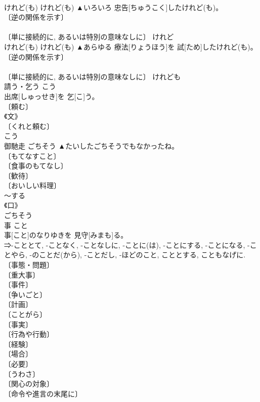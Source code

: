 \documentclass[8pt]{extreport}
\begin{document}
\begin{CJK}{UTF8}{min}
\\	けれど(も)	けれど(も)	▲いろいろ 忠告[ちゅうこく]したけれど(も)。	
\\	〔逆の関係を示す〕 
\\	[＝-が１, かかわらず] 
\\	〔単に接続的に, あるいは特別の意味なしに〕		けれど	
\\	けれど(も)	けれど(も)	▲あらゆる 療法[りょうほう]を 試[ため]したけれど(も)。	
\\	〔逆の関係を示す〕 
\\	[＝-が１, かかわらず] 
\\	〔単に接続的に, あるいは特別の意味なしに〕		けれども	
\\	請う・乞う	こう	
\\	出席[しゅっせき]を 乞[こ]う。	
\\	〔頼む〕 
\\	《文》 
\\	〔くれと頼む〕 
\\	こう	
\\	御馳走	ごちそう	▲たいしたごちそうでもなかったね。	
\\	〔もてなすこと〕 
\\	〔食事のもてなし〕 
\\	〔歓待〕 
\\	〔おいしい料理〕 
\\	～する 
\\	《口》 
\\	ごちそう	
\\	事	こと	
\\	事[こと]のなりゆきを 見守[みまも]る。	
\\	⇒-こととて, -ことなく, -ことなしに, -ことに(は), -ことにする, -ことになる, -ことやら, -のことだ(から), -ことだし, -ほどのこと, こととする, こともなげに. 
\\	〔事態・問題〕 
\\	〔重大事〕 
\\	〔事件〕 
\\	〔争いごと〕 
\\	〔計画〕 
\\	〔ことがら〕 
\\	〔事実〕 
\\	〔行為や行動〕 
\\	〔経験〕 
\\	〔場合〕 
\\	〔必要〕 
\\	〔うわさ〕 
\\	〔関心の対象〕 
\\	〔命令や進言の末尾に〕 

\end{CJK}
\end{document}
